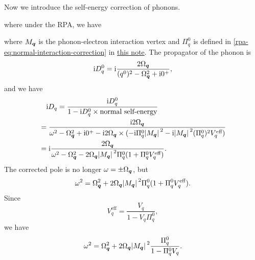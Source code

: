 \documentclass[hyperref, a4paper]{article}
\newcommand*{\ii}{\mathrm{i}}
\newcommand{\rpanote}{\href{./electron-gas.pdf}{this note}}
\begin{document}
Now we introduce the self-energy correction of phonons. 

where under the RPA, we have 

where $M_{\vb*{q}}$ is the phonon-electron interaction vertex and $\Pi^0_q$ is defined in \eqref{rpa-eq:normal-interaction-correction} in \rpanote. 
The propagator of the phonon is 
\begin{equation}
    \ii D^0_q = \ii \frac{2 \Omega_{\vb*{q}}}{(q^0)^2 - \Omega_{\vb*{q}}^2 + \ii 0^+},
\end{equation}
and we have 
\[
    \begin{aligned}
        &\quad \ii D_q = \frac{\ii D^0_q}{1 - \ii D^0_q \times \text{normal self-energy}} \\
        &= \frac{\ii 2 \Omega_{\vb*{q}}}{\omega^2 - \Omega^2_{\vb*{q}} + \ii 0^+ - \ii 2 \Omega_{\vb*{q}} \times (- \ii \Pi^0_q \abs*{M_{\vb*{q}}}^2 - \ii \abs*{M_{\vb*{q}}}^2 (\Pi^0_q)^2 V^\text{eff}_q )} \\
        &= \ii \frac{2 \Omega_{\vb*{q}}}{\omega^2 - \Omega^2_{\vb*{q}} - 2 \Omega_{\vb*{q}} \abs*{M_{\vb*{q}}}^2 \Pi^0_q (1 + \Pi^0_q V^\text{eff}_q)}. 
    \end{aligned}
\]
The corrected pole is no longer $\omega = \pm \Omega_{\vb*{q}}$, but 
\[
    \omega^2 = \Omega^2_{\vb*{q}} + 2 \Omega_{\vb*{q}} \abs*{M_{\vb*{q}}}^2 \Pi^0_q (1 + \Pi^0_q V^\text{eff}_q).
\]
Since 
\[
    V_q^\text{eff} = \frac{V_q}{1 - V_q \Pi^0_q},
\]
we have 
\begin{equation}
    \omega^2 = \Omega^2_{\vb*{q}} + 2 \Omega_{\vb*{q}} \abs*{M_{\vb*{q}}}^2 \frac{\Pi^0_q}{1 - \Pi^0_q V_q} .
    \label{eq:renormalized-phonon-freq}
\end{equation}
\end{document}
